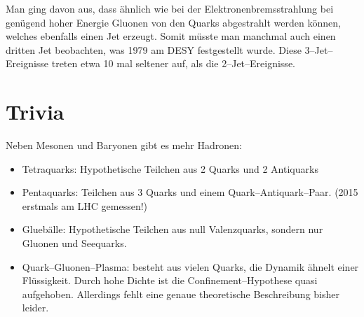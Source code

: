 \documentclass[Ex4_Zusammenfassung.tex]{subfiles}
\begin{document}
Man ging davon aus, dass ähnlich wie bei der Elektronenbremsstrahlung bei genügend hoher Energie Gluonen von den Quarks abgestrahlt werden können, welches ebenfalls einen Jet erzeugt. Somit müsste man manchmal auch einen dritten Jet beobachten, was 1979 am DESY festgestellt wurde. Diese 3--Jet--Ereignisse treten etwa 10 mal seltener auf, als die 2--Jet--Ereignisse.

\section{Trivia}
Neben Mesonen und Baryonen gibt es mehr Hadronen:
\begin{itemize}
	\item Tetraquarks: Hypothetische Teilchen aus 2 Quarks und 2 Antiquarks
	\item Pentaquarks: Teilchen aus 3 Quarks und einem Quark--Antiquark--Paar. (2015 erstmals am LHC gemessen!)
	\item Gluebälle: Hypothetische Teilchen aus null Valenzquarks, sondern nur Gluonen und Seequarks.
	\item Quark--Gluonen--Plasma: besteht aus vielen Quarks, die Dynamik ähnelt einer Flüssigkeit. Durch hohe Dichte ist die Confinement--Hypothese quasi aufgehoben. Allerdings fehlt eine genaue theoretische Beschreibung bisher leider. 
\end{itemize}
\end{document}

